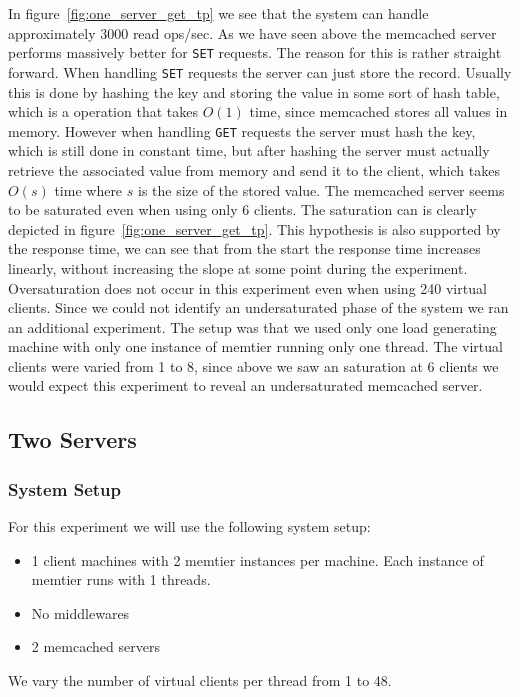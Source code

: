\documentclass[11pt,a4paper]{article}
\begin{document}
%
In figure~\ref{fig:one_server_get_tp} we see that the system can handle approximately 3000 read ops/sec.
%
As we have seen above the memcached server performs massively better for \texttt{SET} requests.
%
The reason for this is rather straight forward.
%
When handling \texttt{SET} requests the server can just store the record.
%
Usually this is done by hashing the key and storing the value in some sort of hash table, which is a operation that takes $O(1)$ time, since memcached stores all values in memory.
%
However when handling \texttt{GET} requests the server must hash the key, which is still done in constant time, but after hashing the server must actually retrieve the associated value from memory and send it to the client, which takes $O(s)$ time where $s$ is the size of the stored value.
%
The memcached server seems to be saturated even when using only 6 clients.
%
The saturation can is clearly depicted in figure~\ref{fig:one_server_get_tp}.
%
This hypothesis is also supported by the response time, we can see that from the start the response time increases linearly, without increasing the slope at some point during the experiment.
%
Oversaturation does not occur in this experiment even when using 240 virtual clients.
%
Since we could not identify an undersaturated phase of the system we ran an additional experiment.
%
The setup was that we used only one load generating machine with only one instance of memtier running only one thread.
%
The virtual clients were varied from 1 to 8, since above we saw an saturation at 6 clients we would expect this experiment to reveal an undersaturated memcached server.
%
%
\subsection{Two Servers}
%
\subsubsection{System Setup}
%
For this experiment we will use the following system setup:
%
\begin{itemize}
	\item 1 client machines with 2 memtier instances per machine. Each instance of memtier runs with 1 threads.
	\item No middlewares
	\item 2 memcached servers
\end{itemize}
%
We vary the number of virtual clients per thread from 1 to 48.
%
\end{document}
